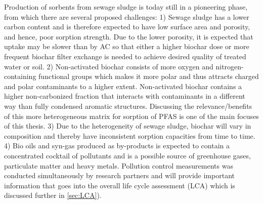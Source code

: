 Production of sorbents from sewage sludge is today still in a pioneering phase, from which there are several proposed challenges: 1) Sewage sludge has a lower carbon content and is therefore expected to have low surface area and porosity, and hence, poor sorption strength. Due to the lower porosity, it is expected that uptake may be slower than by AC so that either a higher biochar dose or more frequent biochar filter exchange is needed to achieve desired quality of treated water or soil. 2) Non-activated biochar consists of more oxygen and nitrogen-containing functional groups which makes it more polar and thus attracts charged and polar contaminants to a higher extent. Non-activated biochar contains a higher non-carbonized fraction that interacts with contaminants in a different way than fully condensed aromatic structures. Discussing the relevance/benefits of this more heterogeneous matrix for sorption of PFAS is one of the main focuses of this thesis. 3) Due to the heterogeneity of sewage sludge, biochar will vary in composition and thereby have inconsistent sorption capacities from time to time. 4) Bio oils and syn-gas produced as by-products is expected to contain a concentrated cocktail of pollutants and is a possible source of greenhouse gases, particulate matter and heavy metals. Pollution control measurements was conducted simultaneously by research partners and will provide important information that goes into the overall life cycle assessment (LCA) which is discussed further in \cref{sec:LCA}). 
